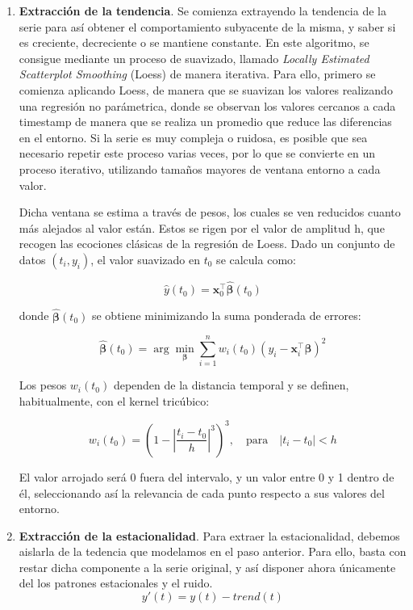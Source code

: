 \begin{enumerate}
	\item \textbf{Extracción de la tendencia}. Se comienza extrayendo la tendencia de la serie para así obtener el comportamiento subyacente de la misma, y saber si es creciente, decreciente o se mantiene constante. En este algoritmo, se consigue mediante un proceso de suavizado, llamado \textit{Locally Estimated Scatterplot Smoothing} (Loess) de manera iterativa. Para ello, primero se comienza aplicando Loess, de manera que se suavizan los valores realizando una regresión no parámetrica, donde se observan los valores cercanos a cada timestamp de manera que se realiza un promedio que reduce las diferencias en el entorno. Si la serie es muy compleja o ruidosa, es posible que sea necesario repetir este proceso varias veces, por lo que se convierte en un proceso iterativo, utilizando tamaños mayores de ventana entorno a cada valor.
	
	Dicha ventana se estima a través de pesos, los cuales se ven reducidos cuanto más alejados al valor están. Estos se rigen por el valor de amplitud h, que recogen las ecociones clásicas de la regresión de Loess. Dado un conjunto de datos \((t_i, y_i)\), el valor suavizado en \( t_0 \) se calcula como:
	
	\[
	\hat{y}(t_0) = \mathbf{x}_0^\top \hat{\boldsymbol{\beta}}(t_0)
	\]
	
	donde \(\hat{\boldsymbol{\beta}}(t_0)\) se obtiene minimizando la suma ponderada de errores:
	
	\[
	\hat{\boldsymbol{\beta}}(t_0) = \arg\min_{\boldsymbol{\beta}} \sum_{i=1}^n w_i(t_0) \left(y_i - \mathbf{x}_i^\top \boldsymbol{\beta}\right)^2
	\]
	
	Los pesos \( w_i(t_0) \) dependen de la distancia temporal y se definen, habitualmente, con el kernel tricúbico:
	
	\[
	w_i(t_0) = \left(1 - \left|\frac{t_i - t_0}{h}\right|^3\right)^3, \quad \text{para} \quad |t_i - t_0| < h
	\]
	
	El valor arrojado será 0 fuera del intervalo, y un valor entre 0 y 1 dentro de él, seleccionando así la relevancia de cada punto respecto a sus valores del entorno.
	
	\item  \textbf{Extracción de la estacionalidad}. Para extraer la estacionalidad, debemos aislarla de la tedencia que modelamos en el paso anterior. Para ello, basta con restar dicha componente a la serie original, y así disponer ahora únicamente del los patrones estacionales y el ruido. 
	$$y'(t) = y(t) - trend(t)$$
	

\end{enumerate}
